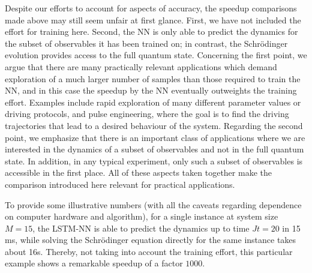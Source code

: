 \documentclass[a4paper,aps,amsmath,amssymb,twocolumn,longbibliography,,accepted=2022-05-17]{quantumarticle}
\begin{document}
Despite our efforts to account for aspects of accuracy, the speedup comparisons made above may still seem unfair at first glance.  First, we have not included the effort for training here. Second, the NN is only able to predict the dynamics for the subset of observables it has been trained on; in contrast, the Schr\"odinger evolution provides access to the full quantum state. Concerning the first point, we argue that there are many practically relevant applications which demand exploration of a much larger number of samples than those required to train the NN, and in this case the speedup by the NN eventually outweights the training effort. Examples include rapid exploration of many different parameter values or driving protocols, and pulse engineering, where the goal is to find the driving trajectories that lead to a desired behaviour of the system.  Regarding the second point, we emphasize that there is an important class of applications where we are interested in the dynamics of a subset of observables and not in the full quantum state. In addition, in any typical experiment, only such a subset of observables is accessible in the first place. All of these aspects taken together make the comparison introduced here relevant for practical applications.

To provide some illustrative numbers (with all the caveats regarding dependence on computer hardware and algorithm), for a single instance at system size $M=15$, the LSTM-NN is able to predict the dynamics up to time $Jt=20$ in 15 ms, while solving the Schr\"odinger equation directly for the same instance takes about 16s. Thereby, not taking into account the training effort, this particular example shows a remarkable speedup of a factor $1000$. 


\end{document}
